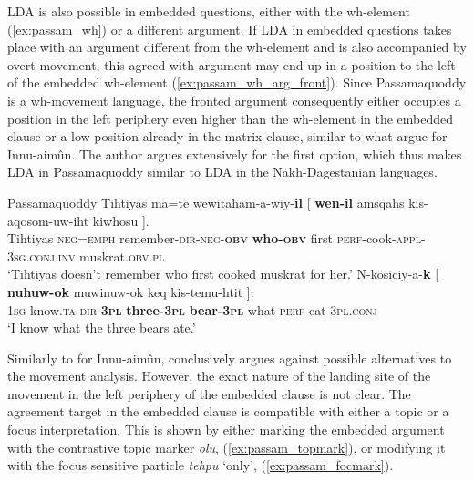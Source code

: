 \documentclass[output=paper
,modfonts
,nonflat]{langsci/langscibook}
\begin{document}
LDA is also possible in embedded questions, either with the wh-element (\ref{ex:passam_wh}) or a different argument. If LDA in embedded questions takes place with an argument different from the wh-element and is also accompanied by overt movement, this agreed-with argument may end up in a position to the left of the embedded wh-element  (\ref{ex:passam_wh_arg_front}). Since Passamaquoddy is a wh-movement language, the fronted argument consequently either occupies a position in the left periphery even higher than the wh-element in the embedded clause or a low position already in the matrix clause, similar to what \citet{Branigan_MacKenzie2002} argue for Innu-aim\^{u}n. The author argues extensively for the first option, which thus makes LDA in Passamaquoddy similar to LDA in the Nakh-Dagestanian languages.\pagebreak
\begin{exe}
\ex Passamaquoddy \citep[][259]{Bruening2001a}
	\xlist
	\ex \label{ex:passam_wh}	
		\gll Tihtiyas ma=te wewitaham-a-wiy-\textbf{il} [ \textbf{wen-il} amsqahs kis-aqosom-uw-iht kiwhosu ].\\
			 Tihtiyas \textsc{neg=emph} remember-\textsc{dir-neg-\textbf{obv}} {} \textbf{who-\textsc{obv}} first \textsc{perf}-cook-\textsc{appl-3sg.conj.inv} muskrat.\textsc{obv.pl}\\
		\glt `Tihtiyas doesn't remember who first cooked muskrat for her.'
	\ex \label{ex:passam_wh_arg_front}
		\gll N-kosiciy-a-\textbf{k} [ \textbf{nuhuw-ok} muwinuw-ok keq  kis-temu-htit ].\\
			 \textsc{1sg}-know.\textsc{ta-dir-\textbf{3pl}} {} \textbf{three-\textsc{3pl}} \textbf{bear-\textsc{3pl}} what \textsc{perf-}eat\textsc{-3pl.conj}\\
		\glt `I know what the three bears ate.' 
	\endxlist
\end{exe}
Similarly to \citet{Branigan_MacKenzie2002} for Innu-aim\^{u}n, \citet{Bruening2001a} conclusively argues against possible alternatives to the movement analysis. However, the exact nature of the landing site of the movement in the left periphery of the embedded clause is not clear. The agreement target in the embedded clause is compatible with either a topic or a focus interpretation. This is shown by either marking the embedded argument with the contrastive topic marker \textit{olu}, (\ref{ex:passam_topmark}), or modifying it with the focus sensitive particle \textit{tehpu} `only', (\ref{ex:passam_focmark}).
\end{document}
